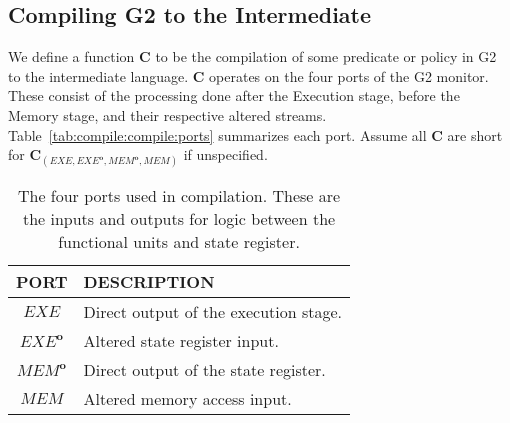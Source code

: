\documentclass[sigconf,usenames,dvipsnames,svgnames,table]{acmart}
\newcommand{\obf}[1]{#1^\mathbf{o}}
\def \sysname {\textsc{G2}\xspace}
\begin{document}
    \subsection{Compiling \sysname to the Intermediate}\label{sec:comp:comp}
      We define a function $\mathbf{C}$ to be the compilation of some predicate or policy in \sysname to the intermediate language.
      $\mathbf{C}$ operates on the four ports of the \sysname monitor.
      These consist of the processing done after the Execution stage, before the Memory stage, and their respective altered streams.
      Table~\ref{tab:compile:compile:ports} summarizes each port.
      Assume all $\mathbf{C}$ are short for $\mathbf{C}_{(EXE,\obf{EXE},\obf{MEM},MEM)}$ if unspecified.
      \begin{table}
        \centering
        \begin{tabular}{c | l}
          PORT        & DESCRIPTION \\ \hline
          $EXE$       & Direct output of the execution stage. \\
          $\obf{EXE}$ & Altered state register input. \\
          $\obf{MEM}$ & Direct output of the state register. \\
          $MEM$       & Altered memory access input. 
        \end{tabular}
        \caption{
          The four ports used in compilation.
          These are the inputs and outputs for logic between the functional units and state register.
        }
        \label{tab:comp:comp:ports}
      \end{table}

\end{document}
